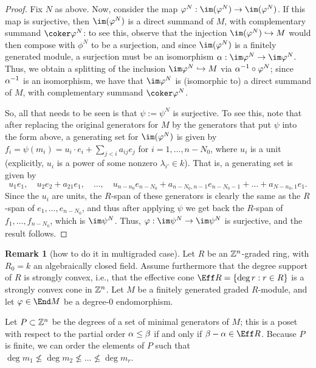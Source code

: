 \documentclass[12pt]{article}
\let\b\beta
\let\l\lambda
\let\inc\hookrightarrow
\theoremstyle{theorem}
\numberwithin{thm}{section}
\theoremstyle{definition}
\newtheorem{rem}[thm]{Remark}
\begin{document}
\begin{proof}
Fix $N$ as above.
Now, consider the map $ \phi^N: \im(\phi^N) \to \im(\phi^N)$. If this map is surjective, then $\im(\phi^N)$ is a direct summand of $M$, with complementary summand $\coker \phi^N$: to see this, observe that the injection $\im(\phi^N) \inc M$ would then  compose with $\phi^N$ to be a surjection, and since $\im(\phi^N)$ is a finitely generated module, a surjection must be an isomorphism $\a:\im \phi^N \to \im \phi^N$. Thus, we obtain a splitting of the inclusion $\im \phi^N \inc M$ via $\alpha^{-1}\circ \varphi^N$; since $\alpha^{-1}$ is an isomorphism, we have that $\im \phi^N$ is (isomorphic to) a direct summand of $M$, with complementary summand $\coker \phi^N$.

So, all that needs to be seen is that $\psi:=\psi^N$ is surjective.
To see this, note that after replacing the original generators for $M$ by the generators that put $\psi$ into the form above,  a generating set for $\im(\phi^N)$ is given by $f_i = \psi(m_i) = u_i\cdot e_i + \sum_{j<i } a_{ij} e_j$ for $i = 1,\dots,n-N_0$, where $u_i$ is a unit (explicitly, $u_i$ is a power of some nonzero $\l_{i'}\in k$).
That is, a generating set is given by 
$$u_1 e_1,\quad  u_2 e_2+a_{21}e_1,\quad \dots ,\quad u_{n-n_0}e_{n-N_0}+a_{n-N_0,n-1}e_{n-N_0-1}+\dots + a_{N-n_0,1}e_1.$$ 
Since the $u_i$ are units, the $R$-span of these generators is clearly the same as the $R$-span of $e_1,\dots,e_{n-N_0}$, and thus after applying $\psi$ we get back the $R$-span of $f_1,\dots,f_{n-N_0} $, which is $\im \psi^N$. Thus, $\phi: \im \psi^N \to \im \psi^N$ is surjective, and the result follows.
\end{proof}

\begin{rem}[how to do it in multigraded case]
Let $R$ be an $\mathbb Z^n$-graded ring, with $R_0=k$ an algebraically closed field.
Assume furthermore that the degree support of $R$ is strongly convex, i.e., that 
the effective cone
$\Eff R = \{ \deg r : r\in R\}$ is a strongly convex cone in $\mathbb Z^n$.
Let $M$ be a finitely generated graded $R$-module, and let $\phi \in \End M$ be a degree-0 endomorphism.

Let $P\subset \mathbb Z^n$ be the degrees of a set of minimal generators of $M$; 
this is a poset with respect to the partial order $\a\leq \b$ if and only if $\b-\a\in \Eff R$.
Because $P$ is finite, we can order the elements of $P$ such that 
$\deg m_1\not\leq \deg m_2\not \leq \dots\not\leq \deg m_r$. 


\end{rem}
\end{document}
